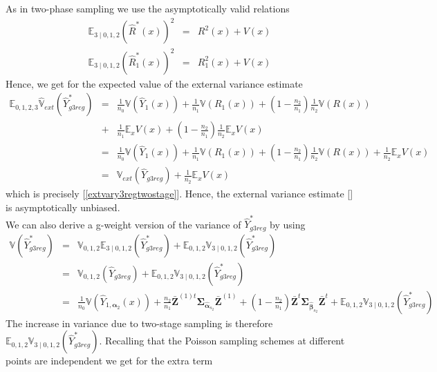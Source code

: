 \documentclass[a4paper,12pt,leqno, titlepage]{article}
\newcommand{\EX}{\mathbb{E}}
\newcommand{\VAR}{\mathbb{V}}
\begin{document}
As in two-phase sampling we use the asymptotically valid relations
\begin{eqnarray}\label{residualsquaredtwostage}
\EX_{3 \mid 0,1,2}(\hat{R}^*(x))^2 &=& R^2(x)+V(x) \nonumber \\
\EX_{3 \mid 0,1,2}(\hat{R}_1^*(x))^2&=&R^2_1(x)+V(x)
 \end{eqnarray}
Hence, we get for the expected value of the external variance estimate
\begin{eqnarray}\label{estexternvaryg3regproof}
\EX_{0,1,2,3}\hat{\VAR}_{ext}(\hat{Y}^*_{g3reg})&=&
\frac{1}{n_0}\VAR(\hat{Y}_1(x)) + \frac{1}{n_1}\VAR(R_1(x))+
(1-\frac{n_2}{n_1})\frac{1}{n_2}\VAR(R(x)) \nonumber \\
&+ &\frac{1}{n_1}\EX_x V(x) + (1-\frac{n_2}{n_1})\frac{1}{n_2}\EX_x V(x)\nonumber \\
&=& \frac{1}{n_0}\VAR(\hat{Y}_1(x)) + \frac{1}{n_1}\VAR(R_1(x))+
(1-\frac{n_2}{n_1})\frac{1}{n_2}\VAR(R(x)) +\frac{1}{n_2}\EX_x V(x)\nonumber \\
&=& \VAR_{ext}(\hat{Y}_{g3reg})+\frac{1}{n_2}\EX_x V(x)
\end{eqnarray}
which is precisely [\ref{extvary3regtwostage}]. Hence, the external variance estimate [\label{estexternvaryg3reg}] is asymptotically unbiased.\\
We can also derive a g-weight version of the variance of $\hat{Y}^*_{g3reg}$ by using
\begin{eqnarray*}\label{theoreticgweightvarthreephasetwostage}
\VAR(\hat{Y}^*_{g3reg})&=&\VAR_{0,1,2}\EX_{3 \mid 0,1,2}(\hat{Y}^*_{g3reg})+ \EX_{0,1,2}\VAR_{3 \mid 0,1,2}(\hat{Y}^*_{g3reg}) \nonumber \\
&=& \VAR_{0,1,2}(\hat{Y}_{g3reg})+\EX_{0,1,2}\VAR_{3 \mid 0,1,2}(\hat{Y}^*_{g3reg}) \nonumber \\
&=& \frac{1}{n_0}\VAR(\hat{Y}_{1,\pmb{\alpha}_2 }(x))
+\frac{n_2}{n_1}\bar{\pmb{Z}}^{(1)t}
\pmb{\Sigma}_{\hat{\pmb{\alpha}}_{s_2}}\bar{\pmb{Z}}^{(1)} + (1-\frac{n_2}{n_1})\bar{\pmb{Z}}^{t}\pmb{\Sigma}_{\hat{\pmb{\beta}}_{s_2}}\bar{\pmb{Z}}^{t} + \EX_{0,1,2}\VAR_{3 \mid 0,1,2}(\hat{Y}^*_{g3reg})
\end{eqnarray*}
The increase in variance due to two-stage sampling is therefore $\EX_{0,1,2}\VAR_{3 \mid 0,1,2}(\hat{Y}^*_{g3reg})$. Recalling that the Poisson sampling schemes at different points are independent we get for the extra term
\end{document}
